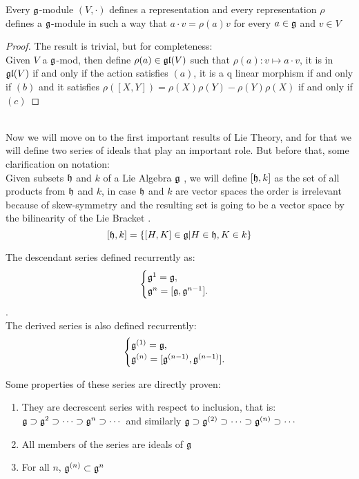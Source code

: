 \begin{prop}
	Every $\mathfrak{g}$-module $(V,\cdot)$ defines a representation and every representation $\rho$ defines a $\mathfrak{g}$-module in such a way that $a \cdot v = \rho(a)v$ for every $a \in \mathfrak{g}$ and $v \in V$
	\label{modequivrep}
\end{prop}
\begin{proof}
	The result is trivial, but for completeness:\\
	Given $V$ a $\mathfrak{g}$-mod, then define $\rho(a) \in \mathfrak{gl}(V)$ such that $\rho(a): v \mapsto a \cdot v$, it is in $\mathfrak{gl}(V)$ if and only if the action satisfies $(a)$, it is a q linear morphism if and only if $(b)$ and it satisfies $\rho([X,Y])=\rho(X)\rho(Y)-\rho(Y)\rho(X)$ if and only if $(c)$
\end{proof}\\
Now we will move on to the first important results of Lie Theory, and for that we will define two series of ideals that play an important role. But before that, some clarification on notation:\\
Given subsets $\mathfrak{h}$ and $k$ of a Lie Algebra $\mathfrak{g}$ , we will define $[\mathfrak{h},k]$ as the set of all products from $\mathfrak{h}$ and $k$, in case $\mathfrak{h}$ and $k$ are vector spaces the order is irrelevant because of skew-symmetry and the resulting set is going to be a vector space by the bilinearity of the Lie Bracket . $$[\mathfrak{h},k] = \{[H,K] \in \mathfrak{g} | H \in \mathfrak{h}, K \in k\}$$
\begin{defi}
	The descendant series defined recurrently as:$$\begin{cases}
	\mathfrak{g}^1 = \mathfrak{g}, \\
	\mathfrak{g}^n = [\mathfrak{g},\mathfrak{g}^{n-1}].
	\end{cases}$$.\\
	The derived series is also defined recurrently: $$\begin{cases}
	\mathfrak{g}^{(1)} = \mathfrak{g},\\
	\mathfrak{g}^{(n)} = [\mathfrak{g}^{(n-1)},\mathfrak{g}^{(n-1)}].
	\end{cases}$$
	\label{13series}
\end{defi}
Some properties of these series are directly proven:
\begin{prop}
	\begin{enumerate}[label=\alph*.]
		\item They are decrescent series with respect to inclusion, that is:\\
		$\mathfrak{g} \supset \mathfrak{g}^2 \supset \cdots \supset \mathfrak{g}^n \supset \cdots $
		and similarly $\mathfrak{g} \supset \mathfrak{g}^{(2)} \supset \cdots \supset \mathfrak{g}^{(n)} \supset \cdots$
		\item All members of the series are ideals of $\mathfrak{g}$
		\item For all $n$,  $\mathfrak{g}^{(n)}\subset \mathfrak{g}^n$
	\end{enumerate}
	\label{13seriesprop}
\end{prop}
